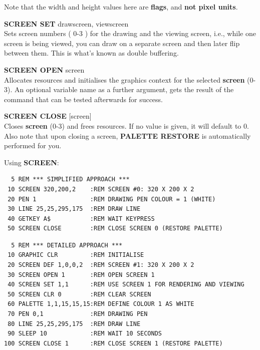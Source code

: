 \begin{description}[leftmargin=2cm,style=nextline]
                Note that the width and height values here are {\bf flags},
                and {\bf not pixel units}.

                {\bf SCREEN SET} drawscreen, viewscreen \\
                Sets screen numbers
                ( 0-3 ) for the drawing and the viewing screen, i.e.,
                while one screen is being viewed, you can draw on a
                separate screen and then later flip between them. This
                is what's known as double buffering.

                {\bf SCREEN OPEN} screen \\
                Allocates resources and
                initialises the graphics context for the selected
                {\bf screen} (0-3).  An optional variable name as
                a further argument, gets the result of the
                command that can be tested afterwards for success.

                {\bf SCREEN CLOSE} [screen] \\
                Closes {\bf screen} (0-3) and frees resources. If no value is given,
                it will default to 0. Also note that upon closing a screen,
                {\bf PALETTE RESTORE} is automatically performed for you.

\item [Examples:] Using {\bf SCREEN}:
\begin{tcolorbox}[colback=black,coltext=white]
\verbatimfont{\codefont}
\begin{verbatim}
  5 REM *** SIMPLIFIED APPROACH ***
 10 SCREEN 320,200,2    :REM SCREEN #0: 320 X 200 X 2
 20 PEN 1               :REM DRAWING PEN COLOUR = 1 (WHITE)
 30 LINE 25,25,295,175  :REM DRAW LINE
 40 GETKEY A$           :REM WAIT KEYPRESS
 50 SCREEN CLOSE        :REM CLOSE SCREEN 0 (RESTORE PALETTE)
\end{verbatim}
\end{tcolorbox}
\begin{tcolorbox}[colback=black,coltext=white]

\verbatimfont{\codefont}
\begin{verbatim}
  5 REM *** DETAILED APPROACH ***
 10 GRAPHIC CLR         :REM INITIALISE
 20 SCREEN DEF 1,0,0,2  :REM SCREEN #1: 320 X 200 X 2
 30 SCREEN OPEN 1       :REM OPEN SCREEN 1
 40 SCREEN SET 1,1      :REM USE SCREEN 1 FOR RENDERING AND VIEWING
 50 SCREEN CLR 0        :REM CLEAR SCREEN
 60 PALETTE 1,1,15,15,15:REM DEFINE COLOUR 1 AS WHITE
 70 PEN 0,1             :REM DRAWING PEN
 80 LINE 25,25,295,175  :REM DRAW LINE
 90 SLEEP 10            :REM WAIT 10 SECONDS
100 SCREEN CLOSE 1      :REM CLOSE SCREEN 1 (RESTORE PALETTE)
\end{verbatim}
\end{tcolorbox}
\end{description}

